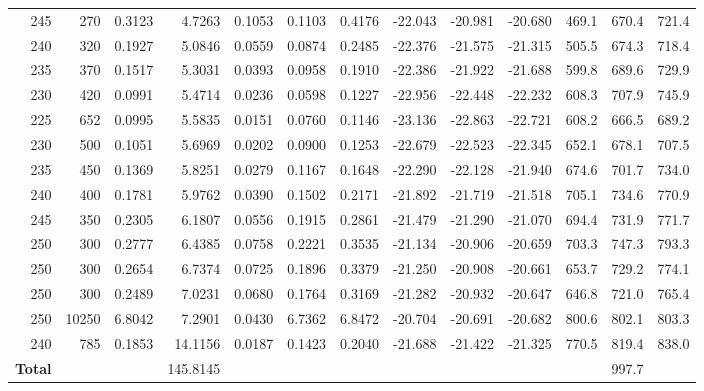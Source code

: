 \begin{landscape}
\begin{footnotesize}
\begin{longtable}{r r r r r r r r r r r r r}
245 & 270 & 0.3123 & 4.7263 & 0.1053 & 0.1103 & 0.4176 & -22.043 & -20.981 & -20.680 & 469.1 & 670.4 & 721.4 \\
240 & 320 & 0.1927 & 5.0846 & 0.0559 & 0.0874 & 0.2485 & -22.376 & -21.575 & -21.315 & 505.5 & 674.3 & 718.4 \\
235 & 370 & 0.1517 & 5.3031 & 0.0393 & 0.0958 & 0.1910 & -22.386 & -21.922 & -21.688 & 599.8 & 689.6 & 729.9 \\
230 & 420 & 0.0991 & 5.4714 & 0.0236 & 0.0598 & 0.1227 & -22.956 & -22.448 & -22.232 & 608.3 & 707.9 & 745.9 \\
225 & 652 & 0.0995 & 5.5835 & 0.0151 & 0.0760 & 0.1146 & -23.136 & -22.863 & -22.721 & 608.2 & 666.5 & 689.2 \\
230 & 500 & 0.1051 & 5.6969 & 0.0202 & 0.0900 & 0.1253 & -22.679 & -22.523 & -22.345 & 652.1 & 678.1 & 707.5 \\
235 & 450 & 0.1369 & 5.8251 & 0.0279 & 0.1167 & 0.1648 & -22.290 & -22.128 & -21.940 & 674.6 & 701.7 & 734.0 \\
240 & 400 & 0.1781 & 5.9762 & 0.0390 & 0.1502 & 0.2171 & -21.892 & -21.719 & -21.518 & 705.1 & 734.6 & 770.9 \\
245 & 350 & 0.2305 & 6.1807 & 0.0556 & 0.1915 & 0.2861 & -21.479 & -21.290 & -21.070 & 694.4 & 731.9 & 771.7 \\
250 & 300 & 0.2777 & 6.4385 & 0.0758 & 0.2221 & 0.3535 & -21.134 & -20.906 & -20.659 & 703.3 & 747.3 & 793.3 \\
250 & 300 & 0.2654 & 6.7374 & 0.0725 & 0.1896 & 0.3379 & -21.250 & -20.908 & -20.661 & 653.7 & 729.2 & 774.1 \\
250 & 300 & 0.2489 & 7.0231 & 0.0680 & 0.1764 & 0.3169 & -21.282 & -20.932 & -20.647 & 646.8 & 721.0 & 765.4 \\
250 & 10250 & 6.8042 & 7.2901 & 0.0430 & 6.7362 & 6.8472 & -20.704 & -20.691 & -20.682 & 800.6 & 802.1 & 803.3 \\
240 & 785 & 0.1853 & 14.1156 & 0.0187 & 0.1423 & 0.2040 & -21.688 & -21.422 & -21.325 & 770.5 & 819.4 & 838.0 \\
\midrule
\textbf{Total} &  &  & 145.8145 &  &  &  &  &  &  &  & 997.7 &  \\
\end{longtable}
\end{footnotesize}
\end{landscape}


